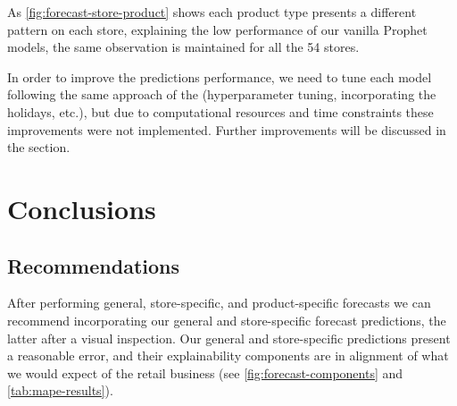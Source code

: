 As \autoref{fig:forecast-store-product} shows each product type presents a different pattern on each store, explaining the low performance of our vanilla Prophet models, the same observation is maintained for all the 54 stores.

In order to improve the predictions performance, we need to tune each model following the same approach of the  (hyperparameter tuning, incorporating the holidays, etc.), but due to computational resources and time constraints these improvements were not implemented. Further improvements will be discussed in the  section. 




\section[Conclusions]{Conclusions}
\label{sec:conclusions}

\subsection[Recommendations]{Recommendations}
\label{sec:recommendations}

After performing general, store-specific, and product-specific forecasts we can recommend incorporating our general and store-specific forecast predictions, the latter after a visual inspection. Our general and store-specific predictions present a reasonable error, and their explainability components are in alignment of what we would expect of the retail business (see \autoref{fig:forecast-components} and \autoref{tab:mape-results}). 

